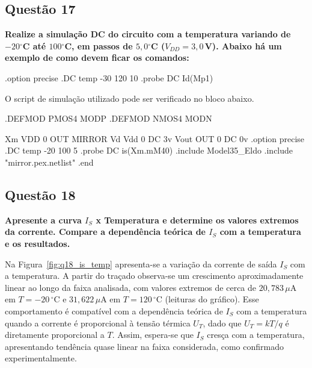 \documentclass[12pt,a4paper]{article}
\newcommand{\degree}{\ensuremath{{}^\circ}}
\begin{document}
\subsection*{Questão 17}
\begin{BoxQ}
    \textbf{Realize a simulação DC do circuito com a temperatura variando de $-20$\degree C até $100$\degree C, em passos de $5{,}0$\degree C ($V_{DD} = 3{,}0$\,V). Abaixo há um exemplo de como devem ficar os comandos:}
\begin{codeblock}[title={Exemplo de comandos ELDO}]
.option precise
.DC temp -30 120 10
.probe DC Id(Mp1)
\end{codeblock}
\end{BoxQ}

O script de simulação utilizado pode ser verificado no bloco abaixo.

\begin{codeblock}[title={Script de simulação (Questão 17)}]
.DEFMOD PMOS4 MODP
.DEFMOD NMOS4 MODN

Xm VDD 0 OUT MIRROR
Vd Vdd 0 DC 3v
Vout OUT 0 DC 0v
.option precise
.DC temp -20 100 5
.probe DC is(Xm.mM40)
.include Model35_Eldo
.include "mirror.pex.netlist"
.end
\end{codeblock}

\subsection*{Questão 18}
\begin{BoxQ}
    \textbf{Apresente a curva $I_{S}$ x Temperatura e determine os valores extremos da corrente. Compare a dependência teórica de $I_{S}$ com a temperatura e os resultados.}
\end{BoxQ}

Na Figura~\ref{fig:q18_is_temp} apresenta-se a variação da corrente de saída $I_S$ com a temperatura. A partir do traçado observa-se um crescimento aproximadamente linear ao longo da faixa analisada, com valores extremos de cerca de $20{,}783\,\mu\text{A}$ em $T=-20\,\degree\text{C}$ e $31{,}622\,\mu\text{A}$ em $T=120\,\degree\text{C}$ (leituras do gráfico). Esse comportamento é compatível com a dependência teórica de $I_S$ com a temperatura quando a corrente é proporcional à tensão térmica $U_T$, dado que $U_T = kT/q$ é diretamente proporcional a $T$. Assim, espera-se que $I_S$ cresça com a temperatura, apresentando tendência quase linear na faixa considerada, como confirmado experimentalmente.
\end{document}
